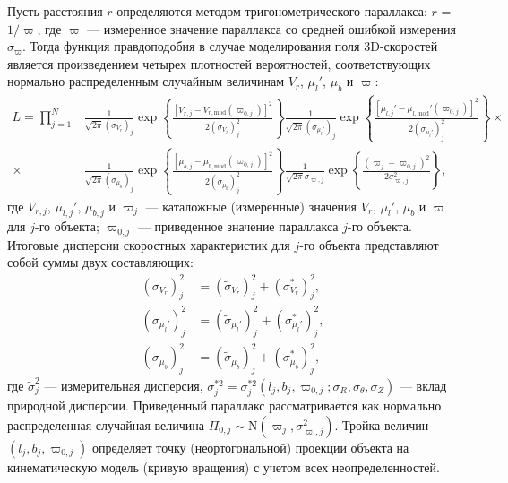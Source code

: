 \documentclass[a4paper, oneside, 14pt]{article}
\begin{document}
Пусть расстояния $ r $ определяются методом тригонометрического параллакса: $ r $ = $ 1 / \varpi $, где $ \varpi $ --- измеренное значение параллакса со средней ошибкой измерения $ \sigma_\varpi $. Тогда функция правдоподобия в случае моделирования поля 3D-скоростей является произведением четырех плотностей вероятностей, соответствующих нормально распределенным случайным величинам $ V_r $, $ \mu_l' $, $ \mu_b $ и $ \varpi $:
%
\begin{align}
  \nonumber
  L = \prod_{j = 1}^N & \frac{1}{\sqrt{2 \pi} (\sigma_{V_r})_j} \exp{\left\{ \frac{[ V_{r,j} - V_{r,\text{mod}} (\varpi_{0,j}) ]^2}{2 (\sigma_{V_r})_j^2} \right\}} \frac{1}{\sqrt{2 \pi} (\sigma_{\mu_l'})_j} \exp{\left\{ \frac{[ \mu_{l,j}' - \mu_{l,\text{mod}}' (\varpi_{0,j}) ]^2}{2 (\sigma_{\mu_l'})_j^2} \right\}} \times {}\\
  {} \times {} & \frac{1}{\sqrt{2 \pi} (\sigma_{\mu_b})_j} \exp{\left\{ \frac{[ \mu_{b,j} - \mu_{b,\text{mod}} (\varpi_{0,j}) ]^2}{2 (\sigma_{\mu_b})_j^2} \right\}} \frac{1}{\sqrt{2 \pi} \sigma_{\varpi,j}} \exp{\left\{ \frac{(\varpi_j - \varpi_{0,j})^2}{2 \sigma_{\varpi,j}^2} \right\}},
\end{align}
%
где $ V_{r,j} $, $ \mu_{l,j}' $, $ \mu_{b,j} $ и $ \varpi_j $ --- каталожные (измеренные) значения $ V_r $, $ \mu_l' $, $ \mu_b $ и $ \varpi $ для $j$-го объекта; $ \varpi_{0,j} $ --- приведенное значение параллакса $j$-го объекта. Итоговые дисперсии скоростных характеристик для $j$-го объекта представляют собой суммы двух составляющих:
%
\begin{align}
  \label{eq:D_V_r}
  (\sigma_{V_r})_j^2 &= (\tilde{\sigma}_{V_r})_j^2 + (\sigma_{V_r}^\ast)_j^2,\\
  \label{eq:D_mu_l'}
  (\sigma_{\mu_l'})_j^2 &= (\tilde{\sigma}_{\mu_l'})_j^2 + (\sigma_{\mu_l'}^\ast)_j^2,\\
  \label{eq:D_mu_b}
  (\sigma_{\mu_b})_j^2 &= (\tilde{\sigma}_{\mu_b})_j^2 + (\sigma_{\mu_b}^\ast)_j^2,
\end{align}
%
где $ \tilde{\sigma}_j^2 $ --- измерительная дисперсия, $ \sigma_j^{\ast 2} = \sigma_j^{\ast 2}(l_j, b_j, \varpi_{0,j}; \sigma_R, \sigma_\theta, \sigma_Z) $ --- вклад природной дисперсии. Приведенный параллакс рассматривается как нормально распределенная случайная величина $ \Pi_{0,j} \sim \mathrm{N}(\varpi_j, \sigma_{\varpi,j}^2) $. Тройка величин $ (l_j, b_j, \varpi_{0,j}) $ определяет точку (неортогональной) проекции объекта на кинематическую модель (кривую вращения) с учетом всех неопределенностей.
\end{document}
